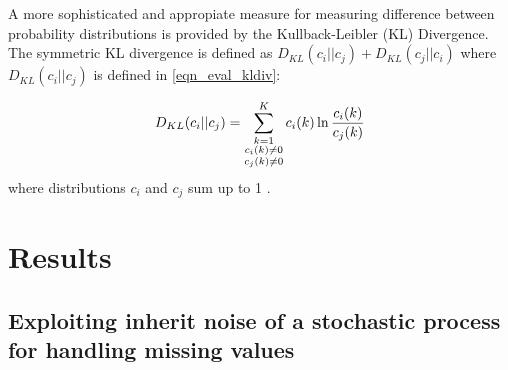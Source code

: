 \documentclass{report}
\begin{document}
A more sophisticated and appropiate measure for measuring difference between probability distributions is provided by the Kullback-Leibler (KL) Divergence. The symmetric KL divergence is defined as $D_{KL}(c_i||c_j)+D_{KL}(c_j||c_i)$ where $D_{KL}(c_i||c_j)$ is defined in \ref{eqn_eval_kldiv}:

\begin{equation}
		D_{KL}(c_i||c_j) = \sum_{\substack{
																	   k=1 \\
																	   c_i(k) \neq 0 \\
																	   c_j(k) \neq 0
																	  }}^{K} c_i(k) \ln{\frac{c_i(k)}{c_j(k)}}  \\
	\label{eqn_eval_kldiv}
\end{equation}
where distributions $c_i$ and $c_j$ sum up to 1 \cite{Kullback1951}.

\chapter{Results}

\section{Exploiting inherit noise of a stochastic process for handling missing values}
\end{document}

